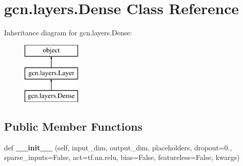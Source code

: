 \hypertarget{classgcn_1_1layers_1_1Dense}{}\section{gcn.\+layers.\+Dense Class Reference}
\label{classgcn_1_1layers_1_1Dense}
Inheritance diagram for gcn.\+layers.\+Dense\+:\begin{figure}[H]
\begin{center}
\leavevmode
\includegraphics[height=3.000000cm]{classgcn_1_1layers_1_1Dense}
\end{center}
\end{figure}
\subsection*{Public Member Functions}
\begin{DoxyCompactItemize}
\item 
\mbox{\label{classgcn_1_1layers_1_1Dense_a336aca01bf10353d9b205c83cbf6e3ee}} 
def {\bfseries \+\_\+\+\_\+init\+\_\+\+\_\+} (self, input\+\_\+dim, output\+\_\+dim, placeholders, dropout=0., sparse\+\_\+inputs=False, act=tf.\+nn.\+relu, bias=False, featureless=False, kwargs)
\end{DoxyCompactItemize}
